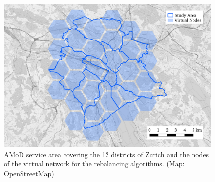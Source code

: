 \begin{figure}[h]
\begin{center}\includegraphics[width=1.0\textwidth]{figures/map.pdf}\end{center}
\caption{AMoD service area covering the 12 districts of Zurich and the nodes of the
virtual network for the rebalancing algorithms. (Map: OpenStreetMap)}
\label{fig:map}
\end{figure}



